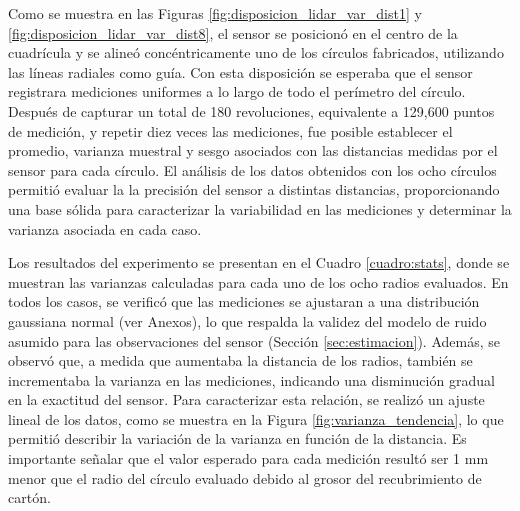Como se muestra en las Figuras \ref{fig:disposicion_lidar_var_dist1} y \ref{fig:disposicion_lidar_var_dist8}, el sensor se posicionó en el centro de la cuadrícula y se alineó concéntricamente uno de los círculos fabricados, utilizando las líneas radiales como guía. Con esta disposición se esperaba que el sensor registrara mediciones uniformes a lo largo de todo el perímetro del círculo. Después de capturar un total de 180 revoluciones, equivalente a 129,600 puntos de medición, y repetir diez veces las mediciones, fue posible establecer el promedio, varianza muestral y sesgo asociados con las distancias medidas por el sensor para cada círculo. El análisis de los datos obtenidos con los ocho círculos permitió evaluar la la precisión del sensor a distintas distancias, proporcionando una base sólida para caracterizar la variabilidad en las mediciones y determinar la varianza asociada en cada caso.

Los resultados del experimento se presentan en el Cuadro \ref{cuadro:stats}, donde se muestran las varianzas calculadas para cada uno de los ocho radios evaluados. En todos los casos, se verificó que las mediciones se ajustaran a una distribución gaussiana normal (ver Anexos), lo que respalda la validez del modelo de ruido asumido para las observaciones del sensor (Sección \ref{sec:estimacion}). Además, se observó que, a medida que aumentaba la distancia de los radios, también se incrementaba la varianza en las mediciones, indicando una disminución gradual en la exactitud del sensor. Para caracterizar esta relación, se realizó un ajuste lineal de los datos, como se muestra en la Figura \ref{fig:varianza_tendencia}, lo que permitió describir la variación de la varianza en función de la distancia. Es importante señalar que el valor esperado para cada medición resultó ser 1 mm menor que el radio del círculo evaluado debido al grosor del recubrimiento de cartón. 

